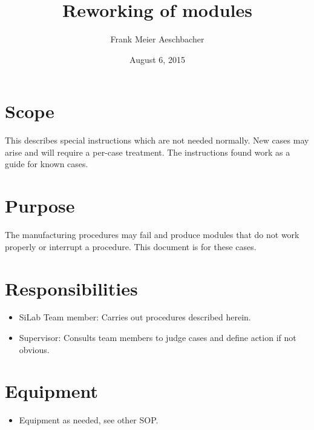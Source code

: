 \documentclass[12pt]{unlsilabsop}
\title{Reworking of modules}
\date{August 6, 2015}
\author{Frank Meier Aeschbacher}
\begin{document}
\maketitle

\section{Scope}
This describes special instructions which are not needed normally. New cases may arise and will require a per-case treatment. The instructions found work as a guide for known cases.

\section{Purpose}
The manufacturing procedures may fail and produce modules that do not work properly or interrupt a procedure. This document is for these cases.


\section{Responsibilities}

\begin{itemize}
    \item SiLab Team member: Carries out procedures described herein.
    \item Supervisor: Consults team members to judge cases and define action if not obvious.
\end{itemize}

\section{Equipment}

\begin{itemize}
    \item Equipment as needed, see other SOP.
\end{itemize}
\end{document}
